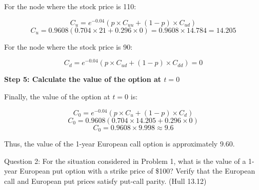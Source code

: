 \documentclass[12pt,letterpaper, onecolumn]{exam}
\begin{document}
\begin{solution}
For the node where the stock price is 110:

\[
C_u = e^{-0.04} \left( p \times C_{uu} + (1 - p) \times C_{ud} \right)
\]
\[
C_u = 0.9608 \left( 0.704 \times 21 + 0.296 \times 0 \right) = 0.9608 \times 14.784 = 14.205
\]

For the node where the stock price is 90:

\[
C_d = e^{-0.04} \left( p \times C_{ud} + (1 - p) \times C_{dd} \right) = 0
\]

\textbf{Step 5: Calculate the value of the option at \( t = 0 \)}

Finally, the value of the option at \( t = 0 \) is:

\[
C_0 = e^{-0.04} \left( p \times C_u + (1 - p) \times C_d \right)
\]
\[
C_0 = 0.9608 \left( 0.704 \times 14.205 + 0.296 \times 0 \right)
\]
\[
C_0 = 0.9608 \times 9.998 \approx 9.6
\]

Thus, the value of the 1-year European call option is approximately \( \boxed{9.60} \).

\end{solution}

    \newpage

\begin{question}{Question 2:}
For the situation considered in Problem 1, what is the value of a 1-year European put option with a strike price of \$100? Verify that the European call and European put prices satisfy put-call parity. (Hull 13.12)
\end{question}
\end{document}
